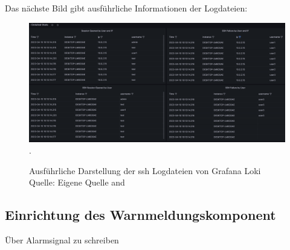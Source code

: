 \newpage
\thispagestyle{lscape}
\begin{landscape}
   Das nächste Bild gibt ausführliche Informationen der Logdateien:
   \begin{center}
      \begin{figure}[H]
         \centering
         \includegraphics[width=1.3\textwidth]{assets/GrafanaLoki_sshDetailed.png}.
         \caption{Ausführliche Darstellung der \gls{ssh} Logdateien von Grafana Loki\\Quelle: Eigene Quelle and \citep{VoidQuark_sshlogs}}
         \centering
      \end{figure}
   \end{center}
\end{landscape}

\subsection{Einrichtung des Warnmeldungskomponent}
Über Alarmsignal zu schreiben
















